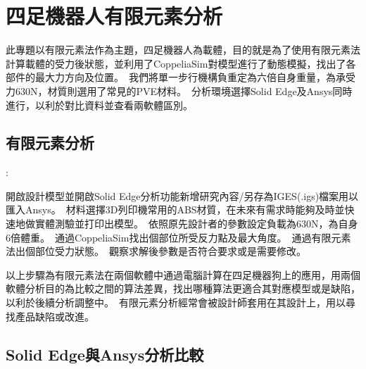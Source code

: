 \chapter{四足機器人有限元素分析}

此專題以有限元素法作為主題，四足機器人為載體，目的就是為了使用有限元素法計算載體的受力後狀態，並利用了CoppeliaSim對模型進行了動態模擬，找出了各部件的最大力方向及位置。\
我們將單一步行機構負重定為六倍自身重量，為承受力630N，材質則選用了常見的PVE材料。\
分析環境選擇Solid Edge及Ansys同時進行，以利於對比資料並查看兩軟體區別。\\

\section{有限元素分析}
\begin{itemize}
:\
\end{itemize}
開啟設計模型並開啟Solid Edge分析功能新增研究內容/另存為IGES(.igs)檔案用以匯入Ansys。\
材料選擇3D列印機常用的ABS材質，在未來有需求時能夠及時並快速地做實體測驗並打印出模型。\
依照原先設計者的參數設定負載為630N，為自身6倍體重。\
通過CoppeliaSim找出個部位所受反力點及最大角度。\
通過有限元素法出個部位受力狀態。\
觀察求解後參數是否符合要求或是需要修改。\

以上步驟為有限元素法在兩個軟體中通過電腦計算在四足機器狗上的應用，用兩個軟體分析目的為比較之間的算法差異，找出哪種算法更適合其對應模型或是缺陷，以利於後續分析調整中。\
有限元素分析經常會被設計師套用在其設計上，用以尋找產品缺陷或改進。\
\newpage
\section{Solid Edge與Ansys分析比較}

\newpage
